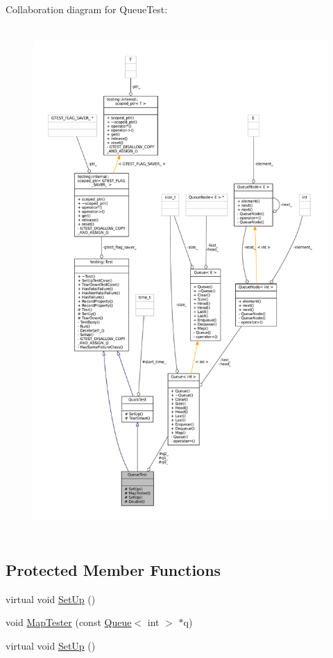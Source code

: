 Collaboration diagram for Queue\+Test\+:
\nopagebreak
\begin{figure}[H]
\begin{center}
\leavevmode
\includegraphics[height=550pt]{classQueueTest__coll__graph}
\end{center}
\end{figure}
\subsection*{Protected Member Functions}
\begin{DoxyCompactItemize}
\item 
virtual void \hyperlink{classQueueTest_a91e69958f086239a523864d6b94ab174}{Set\+Up} ()
\item 
void \hyperlink{classQueueTest_a7f1661cd16c428a130d6ac1e4246eaab}{Map\+Tester} (const \hyperlink{classQueue}{Queue}$<$ int $>$ $\ast$q)
\item 
virtual void \hyperlink{classQueueTest_a91e69958f086239a523864d6b94ab174}{Set\+Up} ()
\end{DoxyCompactItemize}
